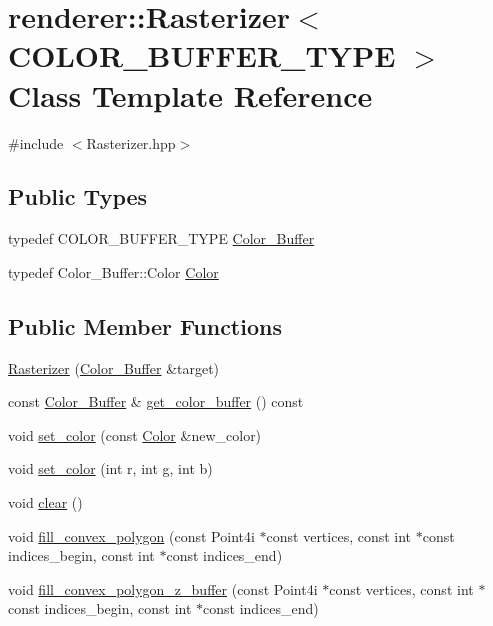 \hypertarget{classrenderer_1_1_rasterizer}{}\section{renderer\+::Rasterizer$<$ C\+O\+L\+O\+R\+\_\+\+B\+U\+F\+F\+E\+R\+\_\+\+T\+Y\+PE $>$ Class Template Reference}
\label{classrenderer_1_1_rasterizer}


{\ttfamily \#include $<$Rasterizer.\+hpp$>$}

\subsection*{Public Types}
\begin{DoxyCompactItemize}
\item 
typedef C\+O\+L\+O\+R\+\_\+\+B\+U\+F\+F\+E\+R\+\_\+\+T\+Y\+PE \mbox{\hyperlink{classrenderer_1_1_rasterizer_a1568956faf65b03116e04b4cb0213770}{Color\+\_\+\+Buffer}}
\item 
typedef Color\+\_\+\+Buffer\+::\+Color \mbox{\hyperlink{classrenderer_1_1_rasterizer_a2f34497f55718e965d3ddc7fb9ef3fca}{Color}}
\end{DoxyCompactItemize}
\subsection*{Public Member Functions}
\begin{DoxyCompactItemize}
\item 
\mbox{\hyperlink{classrenderer_1_1_rasterizer_ac5e189bc1da9bf01482e1a68675f9ce0}{Rasterizer}} (\mbox{\hyperlink{classrenderer_1_1_rasterizer_a1568956faf65b03116e04b4cb0213770}{Color\+\_\+\+Buffer}} \&target)
\item 
const \mbox{\hyperlink{classrenderer_1_1_rasterizer_a1568956faf65b03116e04b4cb0213770}{Color\+\_\+\+Buffer}} \& \mbox{\hyperlink{classrenderer_1_1_rasterizer_aad1766bb1cf80e143aa3fefe7a3a52ff}{get\+\_\+color\+\_\+buffer}} () const
\item 
void \mbox{\hyperlink{classrenderer_1_1_rasterizer_af1f1a00ec1cc48a9a39e087c565b32fb}{set\+\_\+color}} (const \mbox{\hyperlink{classrenderer_1_1_rasterizer_a2f34497f55718e965d3ddc7fb9ef3fca}{Color}} \&new\+\_\+color)
\item 
void \mbox{\hyperlink{classrenderer_1_1_rasterizer_a9bea840f9edbfe4c43dbc53cda17012f}{set\+\_\+color}} (int r, int g, int b)
\item 
void \mbox{\hyperlink{classrenderer_1_1_rasterizer_a3b3bb924be67b6876427deacd6c7fe2c}{clear}} ()
\item 
void \mbox{\hyperlink{classrenderer_1_1_rasterizer_ad3e74bd49d42824b462beb2060f7815d}{fill\+\_\+convex\+\_\+polygon}} (const Point4i $\ast$const vertices, const int $\ast$const indices\+\_\+begin, const int $\ast$const indices\+\_\+end)
\item 
void \mbox{\hyperlink{classrenderer_1_1_rasterizer_a6aab191d54f3062841dc9b85fd98947f}{fill\+\_\+convex\+\_\+polygon\+\_\+z\+\_\+buffer}} (const Point4i $\ast$const vertices, const int $\ast$const indices\+\_\+begin, const int $\ast$const indices\+\_\+end)
\end{DoxyCompactItemize}
